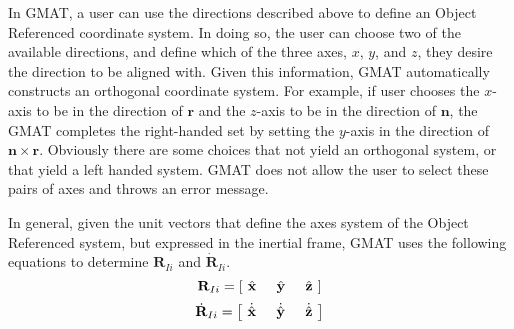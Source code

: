 {In GMAT, a user can use the directions described above to define
an Object Referenced coordinate system.  In doing so, the user can
choose two of the available directions, and define which of the
three axes, $x$, $y$, and $z$, they desire the direction to be
aligned with.  Given this information, GMAT automatically
constructs an orthogonal coordinate system.  For example, if user
chooses the $x$-axis to be in the direction of $\mathbf{r}$ and
the $z$-axis to be in the direction of $\mathbf{n}$, the GMAT
completes the right-handed set by setting the $y$-axis in the
direction of $\mathbf{n} \times \mathbf{r}$.  Obviously there are
some choices that not yield an orthogonal system, or that yield a
left handed system.  GMAT does not allow the user to select these
pairs of axes and throws an error message.

In general, given the unit vectors that define the axes system of
the Object Referenced system, but expressed in the inertial frame,
GMAT uses the following equations to determine $\mathbf{R}_{Ii}$
and $ \dot{\mathbf{R}}_{Ii}$.
%
\begin{equation}
     \mathbf{R}_{Ii} = \left[\hspace{.05 in} \hat{\mathbf{x}} \hspace{.2 in} \hat{\mathbf{y}} \hspace{.2 in} \hat{\mathbf{z}} \hspace{.05 in} \right]
\end{equation}
%
\begin{equation}
     \dot{\mathbf{R}}_{Ii} = \left[\hspace{.05 in} \dot{\hat{\mathbf{x}}} \hspace{.2 in}
     \dot{\hat{\mathbf{y}}} \hspace{.2 in} \dot{\hat{\mathbf{z}}} \hspace{.05 in} \right]
\end{equation}
%
}
